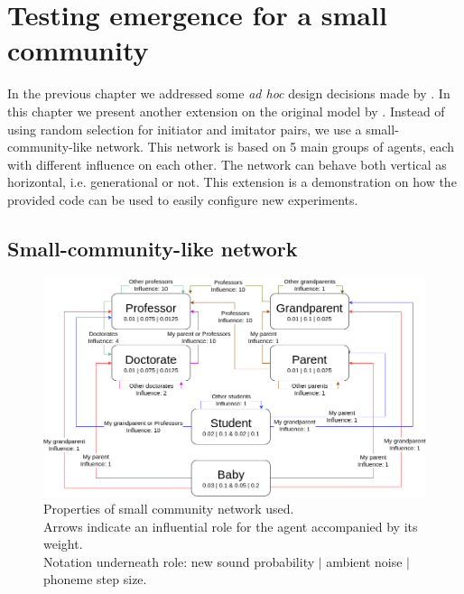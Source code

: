 \chapter{Testing emergence for a small community}
\label{ch:extension}

In the previous chapter we addressed some \textit{ad hoc} design decisions made by \citet{deBoer2000}.
In this chapter we present another extension on the original model by \citet{deBoer2000}.
Instead of using random selection for initiator and imitator pairs, we use a small-community-like network.
This network is based on 5 main groups of agents, each with different influence on each other.
The network can behave both vertical as horizontal, i.e. generational or not.
This extension is a demonstration on how the provided code can be used to easily configure new experiments.



\section{Small-community-like network}
\label{sec:network_idea}

\begin{figure}[H]
    \centering
    \includegraphics[width=\linewidth]{images/extension/network.png}
    \captionsetup{width=\linewidth}
    \captionsetup{justification=centering}
    \caption{Properties of small community network used.\\Arrows indicate an influential role for the agent accompanied by its weight.\\Notation underneath role: new sound probability $|$ ambient noise $|$ phoneme step size.}
    \label{fig:network}
\end{figure}
